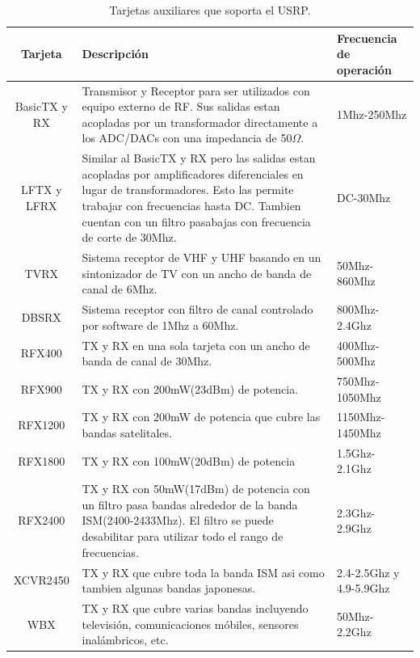 \begin{table}[htp]
\begin{center}
	\begin{tabular}{|c|p{8cm}|p{3cm}|}
		\hline
		\textbf{Tarjeta} & \textbf{Descripci\'on} & \textbf{Frecuencia de operaci\'on}\\
		\hline
		BasicTX y RX & Transmisor y Receptor para ser utilizados con equipo externo de RF. Sus salidas
		estan acopladas por un transformador directamente a los ADC/DACs con una impedancia de 50$\Omega$.
		& 1Mhz-250Mhz\\
		\hline
		LFTX y LFRX & Similar al BasicTX y RX pero las salidas estan acopladas por amplificadores
		diferenciales en lugar de transformadores. Esto las permite trabajar con frecuencias hasta DC.
		Tambien cuentan con un filtro pasabajas con frecuencia de corte de 30Mhz. & DC-30Mhz\\
		\hline
		TVRX & Sistema receptor de VHF y UHF basando en un sintonizador de TV con un ancho de banda de
		canal de 6Mhz. & 50Mhz-860Mhz\\
		\hline
		DBSRX & Sistema receptor con filtro de canal controlado por software de 1Mhz a 60Mhz. &
		800Mhz-2.4Ghz\\
		\hline
		RFX400 & TX y RX en una sola tarjeta con un ancho de banda de canal de 30Mhz. & 400Mhz-500Mhz\\
		\hline
		RFX900 & TX y RX con 200mW(23dBm) de potencia.  & 750Mhz-1050Mhz\\
		\hline
		RFX1200 & TX y RX con 200mW de potencia que cubre las bandas satelitales. & 1150Mhz-1450Mhz\\
		\hline
		RFX1800 & TX y RX con 100mW(20dBm) de potencia & 1.5Ghz-2.1Ghz\\
		\hline
		RFX2400 & TX y RX con 50mW(17dBm) de potencia con un filtro pasa bandas alrededor de la banda
		ISM(2400-2433Mhz). El filtro se puede desabilitar para utilizar todo el rango de frecuencias. &
		2.3Ghz-2.9Ghz\\
		\hline
		XCVR2450 & TX y RX que cubre toda la banda ISM asi como tambien algunas bandas japonesas. &
		2.4-2.5Ghz y 4.9-5.9Ghz\\
		\hline
		WBX & TX y RX que cubre varias bandas incluyendo televisi\'on, comunicaciones m\'obiles, sensores
		inal\'ambricos, etc. & 50Mhz-2.2Ghz\\
		\hline
	\end{tabular}\label{tbl:cards}
	\vspace{0.5in}
	\caption{Tarjetas auxiliares que soporta el USRP.}
\end{center}
\end{table}

